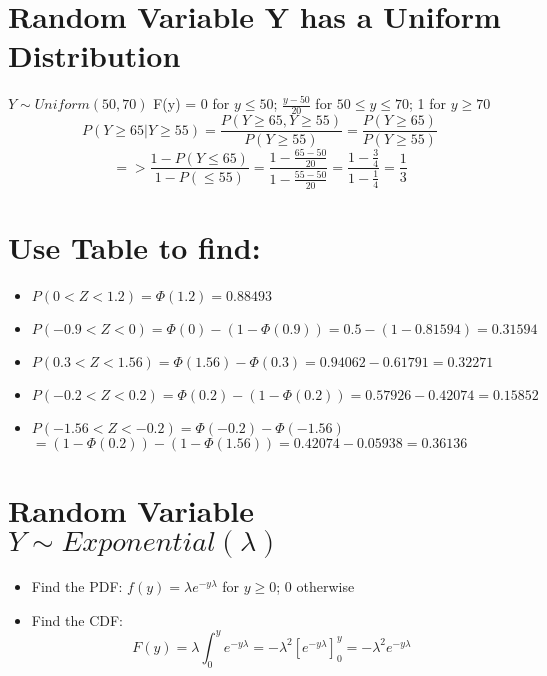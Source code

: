 \documentclass[a4paper, 12pt]{article}
\begin{document}
\section {Random Variable Y has a Uniform Distribution}
$Y \sim Uniform(50, 70)$\newline
F(y) = 0 for $y \leq 50$; $\frac{y - 50}{20}$ for $50 \leq y \leq 70$; 1 for $y\geq 70$
$$P(Y\geq 65 | Y \geq 55) = \frac{P(Y\geq 65, Y \geq 55)}{P(Y \geq 55)} = \frac{P(Y\geq 65)}{P(Y \geq 55)}$$
$$=> \frac{1 - P(Y \leq 65)}{1 - P(\leq 55)} = \frac{1 - \frac{65 - 50}{20}}{1 - \frac{55-50}{20}} = \frac{1-\frac{3}{4}}{1 - \frac{1}{4}} = \frac{1}{3}$$

\section {Use Table to find: }
\begin{itemize}
\item $P(0 < Z < 1.2) = \Phi(1.2) = 0.88493$
\item $P(-0.9 < Z < 0) = \Phi(0) - (1 - \Phi(0.9)) = 0.5 - (1 - 0.81594) = 0.31594$
\item $P(0.3 < Z < 1.56) = \Phi(1.56) - \Phi(0.3) = 0.94062 - 0.61791 = 0.32271$
\item $P(-0.2 < Z < 0.2) = \Phi(0.2) - (1 - \Phi(0.2)) = 0.57926 - 0.42074 = 0.15852$
\item $P(-1.56 < Z < -0.2) = \Phi(-0.2) - \Phi(-1.56)$\newline$ = (1-\Phi(0.2)) - (1-\Phi(1.56)) = 0.42074 - 0.05938 = 0.36136$
\end{itemize}

\section {Random Variable $Y \sim Exponential(\lambda)$}
\begin{itemize}
\item Find the PDF:
\newline $f(y) = \lambda e^{-y\lambda}$ for $y\geq 0$; 0 otherwise
\item Find the CDF:
$$F(y) = \lambda\int_0^ye^{-y\lambda} = -\lambda^2[e^{-y\lambda}]_0^y = -\lambda^2e^{-y\lambda}$$
\end{itemize}
\end{document}
